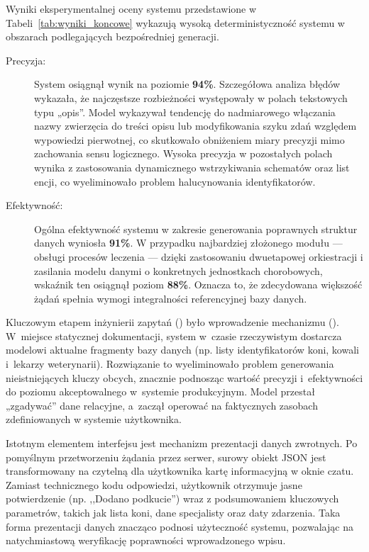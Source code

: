 Wyniki eksperymentalnej oceny systemu przedstawione w Tabeli~\ref{tab:wyniki_koncowe} wykazują wysoką deterministyczność systemu w obszarach podlegających bezpośredniej generacji.

\begin{description}
	\item[Precyzja:] System osiągnął wynik na poziomie \textbf{94\%}. Szczegółowa analiza błędów wykazała, że najczęstsze rozbieżności występowały w polach tekstowych typu „opis”. Model wykazywał tendencję do nadmiarowego włączania nazwy zwierzęcia do treści opisu lub modyfikowania szyku zdań względem wypowiedzi pierwotnej, co skutkowało obniżeniem miary precyzji mimo zachowania sensu logicznego. Wysoka precyzja w pozostałych polach wynika z zastosowania dynamicznego wstrzykiwania schematów oraz list encji, co wyeliminowało problem halucynowania identyfikatorów.
	\item[Efektywność:] Ogólna efektywność systemu w zakresie generowania poprawnych struktur danych wyniosła \textbf{91\%}. W przypadku najbardziej złożonego modułu — obsługi procesów leczenia — dzięki zastosowaniu dwuetapowej orkiestracji i zasilania modelu danymi o konkretnych jednostkach chorobowych, wskaźnik ten osiągnął poziom \textbf{88\%}. Oznacza to, że zdecydowana większość żądań spełnia wymogi integralności referencyjnej bazy danych.
\end{description}

Kluczowym etapem inżynierii zapytań () było wprowadzenie mechanizmu  (). W~miejsce statycznej dokumentacji, system w~czasie rzeczywistym dostarcza modelowi aktualne fragmenty bazy danych (np. listy identyfikatorów koni, kowali i~lekarzy weterynarii). Rozwiązanie to wyeliminowało problem generowania nieistniejących kluczy obcych, znacznie podnosząc wartość precyzji i~efektywności do poziomu akceptowalnego w~systemie produkcyjnym. Model przestał „zgadywać” dane relacyjne, a~zaczął operować na faktycznych zasobach zdefiniowanych w systemie użytkownika.

Istotnym elementem interfejsu jest mechanizm prezentacji danych zwrotnych. Po pomyślnym przetworzeniu żądania przez serwer, surowy obiekt JSON jest transformowany na czytelną dla użytkownika kartę informacyjną w oknie czatu. Zamiast technicznego kodu odpowiedzi, użytkownik otrzymuje jasne potwierdzenie (np. ,,Dodano podkucie'') wraz z podsumowaniem kluczowych parametrów, takich jak lista koni, dane specjalisty oraz daty zdarzenia. Taka forma prezentacji danych znacząco podnosi użyteczność systemu, pozwalając na natychmiastową weryfikację poprawności wprowadzonego wpisu.


